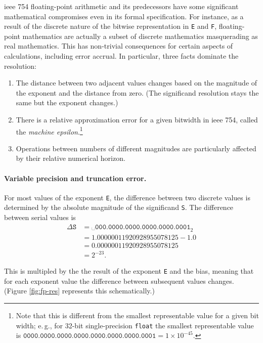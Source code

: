 \documentclass[twoside]{article}
\begin{document}
{\sc ieee} 754 floating-point arithmetic and its predecessors have some significant mathematical compromises even in its formal specification.  For instance, as a result of the discrete nature of the bitwise representation in \texttt{E} and \texttt{F}, floating-point mathematics are actually a subset of discrete mathematics masquerading as real mathematics.  This has non-trivial consequences for certain aspects of calculations, including error accrual.  In particular, three facts dominate the resolution:

\begin{enumerate}
  \item  The distance between two adjacent values changes based on the magnitude of the exponent and the distance from zero.  (The significand resolution stays the same but the exponent changes.)
  \item  There is a relative approximation error for a given bitwidth in {\sc ieee} 754, called the \emph{machine epsilon}.\footnote{Note that this is different from the smallest representable value for a given bit width; e.\,g., for 32-bit single-precision \texttt{float} the smallest representable value is $\texttt{0000.0000.0000.0000.0000.0000.0000.0001} = 1\times 10^{-45}$.}
  \item  Operations between numbers of different magnitudes are particularly affected by their relative numerical horizon.
\end{enumerate}

\paragraph{Variable precision and truncation error.}

For most values of the exponent \texttt{E}, the difference between two discrete values is determined by the absolute magnitude of the significand \texttt{S}.  The difference between serial values is
\begin{align}
  \Delta\texttt{S} &= \texttt{␣000.0000.0000.0000.0000.0001}_{2} \nonumber \\
  & = 1.00000011920928955078125 - 1.0 \nonumber \\
  & = 0.00000011920928955078125 \nonumber \\
  & = 2^{-23}\textrm{.}
\end{align}

\noindent
This is multipled by the the result of the exponent \texttt{E} and the bias, meaning that for each exponent value the difference between subsequent values changes.  (Figure \ref{fig:fp-res} represents this schematically.)
\end{document}

